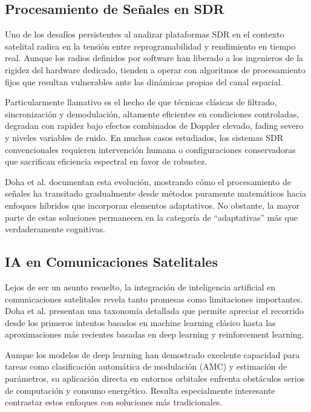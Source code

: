 \subsection{Procesamiento de Señales en SDR}

Uno de los desafíos persistentes al analizar plataformas SDR en el contexto satelital radica en la tensión entre reprogramabilidad y rendimiento en tiempo real. Aunque los radios definidos por software han liberado a los ingenieros de la rigidez del hardware dedicado, tienden a operar con algoritmos de procesamiento fijos que resultan vulnerables ante las dinámicas propias del canal espacial.

Particularmente llamativo es el hecho de que técnicas clásicas de filtrado, sincronización y demodulación, altamente eficientes en condiciones controladas, degradan con rapidez bajo efectos combinados de Doppler elevado, fading severo y niveles variables de ruido. En muchos casos estudiados, los sistemas SDR convencionales requieren intervención humana o configuraciones conservadoras que sacrifican eficiencia espectral en favor de robustez. 

Doha et al. \cite{Doha2026} documentan esta evolución, mostrando cómo el procesamiento de señales ha transitado gradualmente desde métodos puramente matemáticos hacia enfoques híbridos que incorporan elementos adaptativos. No obstante, la mayor parte de estas soluciones permanecen en la categoría de ``adaptativas'' más que verdaderamente cognitivas.

\subsection{IA en Comunicaciones Satelitales}

Lejos de ser un asunto resuelto, la integración de inteligencia artificial en comunicaciones satelitales revela tanto promesas como limitaciones importantes. Doha et al. \cite{Doha2026} presentan una taxonomía detallada que permite apreciar el recorrido desde los primeros intentos basados en machine learning clásico hasta las aproximaciones más recientes basadas en deep learning y reinforcement learning.

Aunque los modelos de deep learning han demostrado excelente capacidad para tareas como clasificación automática de modulación (AMC) y estimación de parámetros, su aplicación directa en entornos orbitales enfrenta obstáculos serios de computación y consumo energético. Resulta especialmente interesante contrastar estos enfoques con soluciones más tradicionales.

